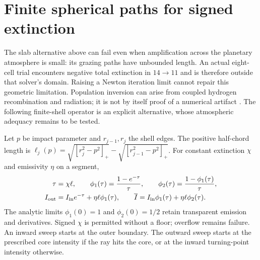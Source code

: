 \documentclass[10pt,a4paper]{article}
\begin{document}
\section{Finite spherical paths for signed extinction}
The slab alternative above can fail even when amplification across the
planetary atmosphere is small: its grazing paths have unbounded length.
An actual eight-cell trial encounters negative total extinction in
$14\to11$ and is therefore outside that solver's domain. Raising a Newton
iteration limit cannot repair this geometric limitation. Population inversion
can arise from coupled hydrogen recombination and radiation; it is not by
itself proof of a numerical artifact \cite{zhu}. The following finite-shell
operator is an explicit alternative, whose atmospheric adequacy remains to
be tested.

Let $p$ be impact parameter and $r_{j-1},r_j$ the shell edges. The positive
half-chord length is
$\ell_j(p)=\sqrt{[r_j^2-p^2]_+}-\sqrt{[r_{j-1}^2-p^2]_+}$.
For constant extinction $\chi$ and emissivity $\eta$ on a segment,
\begin{align}
 \tau&=\chi\ell,\qquad
 \phi_1(\tau)=\frac{1-e^{-\tau}}{\tau},\qquad
 \phi_2(\tau)=\frac{1-\phi_1(\tau)}{\tau},\nonumber\\
 I_{\rm out}&=I_{\rm in}e^{-\tau}+\eta\ell\phi_1(\tau),\qquad
 \overline I=I_{\rm in}\phi_1(\tau)+\eta\ell\phi_2(\tau).
 \label{eq:spherical_segment}
\end{align}
The analytic limits $\phi_1(0)=1$ and $\phi_2(0)=1/2$ retain transparent
emission and derivatives. Signed $\chi$ is permitted without a floor;
overflow remains failure. An inward sweep starts at the outer boundary.
The outward sweep starts at the prescribed core intensity if the ray hits
the core, or at the inward turning-point intensity otherwise.
\end{document}
